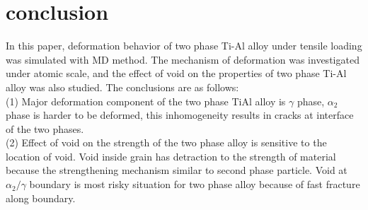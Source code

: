\documentclass[Unknown,article,submit,moreauthors,pdftex,10pt,a4paper]{Definitions/mdpi}
\begin{document}
\section{conclusion}
In this paper, deformation behavior of two phase Ti-Al alloy under tensile loading was simulated with MD method. The mechanism of deformation was investigated under atomic scale, and the effect of void on the properties of two phase Ti-Al alloy was also studied.  The conclusions are as follows:\\
(1) Major deformation component of the two phase TiAl alloy is $\gamma$ phase, $\alpha_2$ phase is harder to be deformed, this inhomogeneity results in cracks at interface of the two phases. \\
(2) Effect of  void on the strength of the two phase alloy is sensitive to the location of  void. Void inside grain has detraction to the strength of material because the strengthening mechanism similar to second phase particle. Void at $\alpha_2 / \gamma$ boundary is most risky situation for two phase alloy because of fast fracture along boundary.


\end{document}
